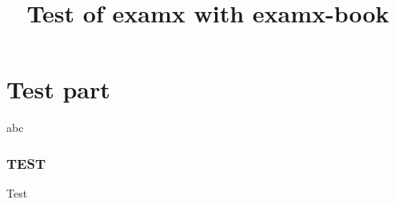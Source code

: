 \documentclass{article}
\title{Test of examx with examx-book}
\begin{document}
    \maketitle
    
    
    \part{Test part}
    
    abc
    \section{TEST}
    Test
\end{document}
